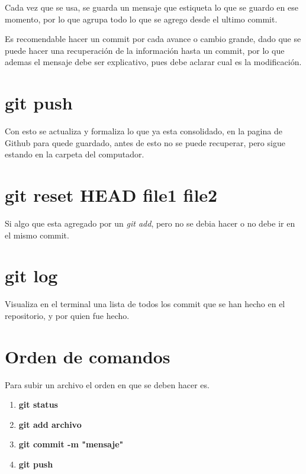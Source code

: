 \documentclass[letter,10pt]{article}
\newcommand{\g}{Github }
\begin{document}
Cada vez que se usa, se guarda un mensaje que estiqueta lo que se guardo en ese momento, por lo que agrupa todo lo que se agrego desde el ultimo commit. 

Es recomendable hacer un commit por cada avance o cambio grande, dado que se puede hacer una recuperación de la información hasta un commit, por lo que ademas el mensaje debe ser explicativo, pues debe aclarar cual es la modificación.

\section{git push}

Con esto se actualiza y formaliza lo que ya esta consolidado, en la pagina de \g para quede guardado, antes de esto no se puede recuperar, pero sigue estando en la carpeta del computador. 

\section{git reset HEAD file1 file2}

Si algo que esta agregado por un \textit{git add}, pero no se debia hacer o no debe ir en el mismo commit.

\section{git log}

Visualiza en el terminal una lista de todos los commit que se han hecho en el repositorio, y por quien fue hecho.

\section{Orden de comandos}
Para subir un archivo el orden en que se deben hacer es. 

\begin{enumerate}
\item \textbf{git status}
\item \textbf{git add archivo}
\item \textbf{git commit -m "mensaje"}
\item \textbf{git push}

\end{enumerate}
 
 
\end{document}
